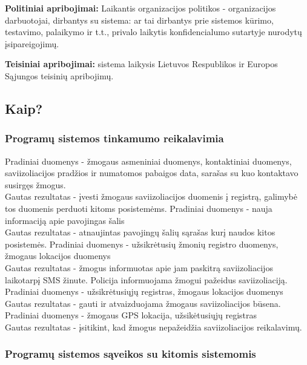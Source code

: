 \documentclass{VUMIFPSkursinis}
\begin{document}
\textbf{Politiniai apribojimai:} Laikantis organizacijos politikos - organizacijos darbuotojai, dirbantys su sistema: ar tai dirbantys prie sistemos kūrimo, testavimo, palaikymo ir t.t., privalo laikytis konfidencialumo sutartyje nurodytų įsipareigojimų.

\textbf{Teisiniai apribojimai:} sistema laikysis Lietuvos Respublikos ir Europos Sąjungos teisinių apribojimų.

\subsection{Kaip?}\label{sec:PSReqHow}
	\subsubsection{Programų sistemos tinkamumo reikalavimia}
			Pradiniai duomenys - žmogaus asmeniniai duomenys, kontaktiniai duomenys, saviizoliacijos pradžios ir numatomos pabaigos data, sarašas su kuo kontaktavo susirgęs žmogus.
			\\
			Gautas rezultatas - įvesti žmogaus saviizoliacijos duomenis į registrą, galimybė tos duomenis perduoti kitoms posistemėms.
			Pradiniai duomenys - nauja informaciją apie pavojingas šalis
			\\
			Gautas rezultatas - atnaujintas pavojingų šalių sąrašas kurį naudos kitos posistemės.
			Pradiniai duomenys - užsikrėtusių žmonių registro duomenys, žmogaus lokacijos duomenys
			\\
			Gautas rezultatas - žmogus informuotas apie jam paskitrą saviizoliacijos laikotarpį SMS žinute. Policija informuojama žmogui pažeidus saviizoliaciją.
			Pradiniai duomenys - užsikrėtusiųjų registras, žmogaus lokacijos duomenys
			\\
			Gautas rezultatas - gauti ir atvaizduojama žmogaus saviizoliacijos būsena.
			Pradiniai duomenys - žmogaus GPS lokacija, užsikėtusiųjų registras
			\\
			Gautas rezultatas - įsitikint, kad žmogus nepažeidžia saviizoliacijos reikalavimų.
	\subsubsection{Programų sistemos sąveikos su kitomis sistemomis}
\end{document}
